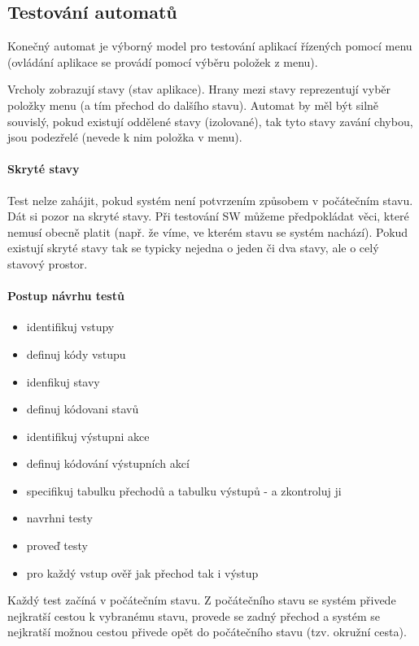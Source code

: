 \subsection{Testování automatů}
Konečný automat je výborný model pro testování aplikací řízených pomocí menu (ovládání aplikace se provádí pomocí výběru položek z menu).

Vrcholy zobrazují stavy (stav aplikace). Hrany mezi stavy reprezentují vyběr položky menu (a tím přechod do dalšího stavu). Automat by měl být silně souvislý, pokud existují oddělené stavy (izolované), tak tyto stavy zavání chybou, jsou podezřelé (nevede k nim položka v menu).

\paragraph{Skryté stavy}
Test nelze zahájit, pokud systém není potvrzením způsobem v počátečním stavu. Dát si pozor na skryté stavy. Při testování SW můžeme předpokládat věci, které nemusí obecně platit (např. že víme, ve kterém stavu se systém nachází). Pokud existují skryté stavy tak se typicky nejedna o jeden či dva stavy, ale o celý stavový prostor.

\paragraph{Postup návrhu testů}

\begin{itemize}[itemsep=0px]
\item identifikuj vstupy
\item definuj kódy vstupu
\item idenfikuj stavy
\item definuj kódovani stavů
\item identifikuj výstupni akce
\item definuj kódování výstupních akcí
\item specifikuj tabulku přechodů a tabulku výstupů - a zkontroluj ji
\item navrhni testy
\item proveď testy
\item pro každý vstup ověř jak přechod tak i výstup
\end{itemize}

Každý test začíná v počátečním stavu. Z počátečního stavu se systém přivede nejkratší cestou k vybranému stavu, provede se zadný přechod a systém se nejkratší možnou cestou přivede opět do počátečního stavu (tzv. okružní cesta).

